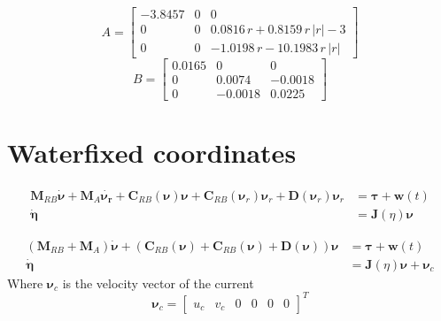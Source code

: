 \documentclass[12pt,a4]{article}
\begin{document}
\begin{equation}
	A = \left[\begin{array}{ccc} -3.8457 & 0 & 0\\ 0 & 0 & 0.0816\,r+0.8159\,r\,\left|r\right|-3\\ 0 & 0 & -1.0198\,r-10.1983\,r\,\left|r\right| \end{array}\right]
\end{equation}
\begin{equation}
	B = \left[\begin{array}{ccc} 0.0165 & 0 & 0\\ 0 & 0.0074 & -0.0018\\ 0 & -0.0018 & 0.0225 \end{array}\right]
\end{equation}

\section{Waterfixed coordinates}

\begin{align}
	\bm{M}_{RB}\bm{\dot{\nu}} + \bm{M}_{A}\bm{\dot{\nu_r}} + \bm{C}_{RB}(\bm{\nu})\bm{\nu} + \bm{C}_{RB}(\bm{\nu}_r)\bm{\nu}_r + \bm{D}(\bm{\nu}_r)\bm{\nu}_r & = \bm{\tau} + \bm{w}(t) \\
	\bm{\dot{\eta}}                                                                                                                                           & = \bm{J}(\eta)\bm{\nu}
\end{align}

\begin{align}
	\left(\bm{M}_{RB} + \bm{M}_{A}  \right) \bm{\dot{\nu}} + \left(\bm{C}_{RB}(\bm{\nu}) + \bm{C}_{RB}(\bm{\nu}) + \bm{D}(\bm{\nu})  \right)\bm{\nu} & = \bm{\tau} + \bm{w}(t)             \\
	\bm{\dot{\eta}}                                                                                                                                  & = \bm{J}(\eta)\bm{\nu} + \bm{\nu}_c
\end{align}
Where $\bm{\nu}_c$ is the velocity vector of the current
\begin{equation}
	\bm{\nu}_c =  \begin{bmatrix}u_c & v_c & 0 & 0 & 0 & 0 \end{bmatrix}^T
\end{equation}
\end{document}
